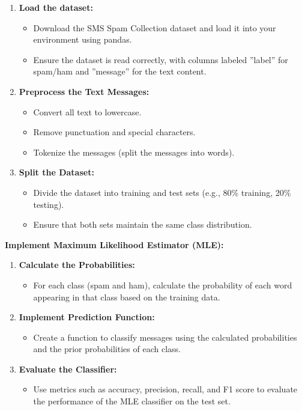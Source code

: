 \documentclass[a3paper,12pt]{extarticle} %
\begin{document}
\begin{enumerate}
    \item \textbf{Load the dataset:}
    \begin{itemize}
        \item Download the SMS Spam Collection dataset and load it into your environment using pandas.
        \item Ensure the dataset is read correctly, with columns labeled ”label” for spam/ham and ”message” for the text content.
    \end{itemize}
    \item \textbf{Preprocess the Text Messages:}
    \begin{itemize}
    \item Convert all text to lowercase.
    \item Remove punctuation and special characters.
    \item Tokenize the messages (split the messages into words).
    \end{itemize}
    \item \textbf{Split the Dataset:}
    \begin{itemize}
        \item Divide the dataset into training and test sets (e.g., 80\% training, 20\% testing).
        \item Ensure that both sets maintain the same class distribution.
    \end{itemize}
\end{enumerate}
\textbf{Implement Maximum Likelihood Estimator (MLE):}
\begin{enumerate}
    \item \textbf{Calculate the  Probabilities:}
    \begin{itemize}
        \item For each class (spam and ham), calculate the probability of each word appearing in that class based on the training data.
    \end{itemize}
    \item  \textbf{Implement Prediction Function:}
    \begin{itemize}
        \item Create a function to classify messages using the calculated probabilities and the prior probabilities of each class.
    \end{itemize}
    \item \textbf{Evaluate the Classifier:}
    \begin{itemize}
        \item Use metrics such as accuracy, precision, recall, and F1 score to evaluate the performance of the MLE classifier on the test set.
    \end{itemize}
\end{enumerate}
\end{document}
